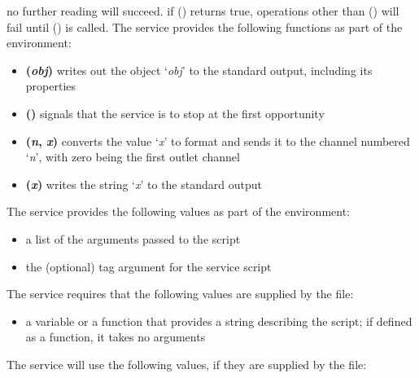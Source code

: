 no further reading will succeed.
if () returns true, operations other than () will fail
until () is called.
\tertiaryEnd
\secondaryEnd
{}
The \JSIO{} service provides the following functions as part of the \JS{} environment:
\begin{itemize}
\item\textbf{(\textit{obj})} \longDash{} writes out the object
`\textit{obj}' to the standard output, including its properties
\item\exSp\textbf{()} \longDash{} signals that the service is to stop
at the first opportunity
\item\exSp\textbf{(\textit{n}, \textit{x})} \longDash{} converts the
value `\textit{x}' to \yarp{} format and sends it to the channel numbered `\textit{n}',
with zero being the first outlet channel
\item\exSp\textbf{(\textit{x})} \longDash{} writes the string
`\textit{x}' to the standard output
\end{itemize}
\secondaryEnd
{}
The \JSIO{} service provides the following values as part of the \JS{} environment:
\begin{itemize}
\item\exSp\textbf{\openSq\closeSq} \longDash{} a list of the arguments passed
to the script
\item\exSp\textbf{} \longDash{} the (optional) tag argument for the service
script
\end{itemize}
\secondaryEnd
{}
The \JSIO{} service requires that the following values are supplied by the \JS{} file:
\begin{itemize}
\item\textbf{} \longDash{} a variable or a function that
provides a string describing the script; if defined as a function, it takes no arguments
\end{itemize}
\secondaryEnd
{}
The \JSIO{} service will use the following values, if they are supplied by the \JS{} file:
